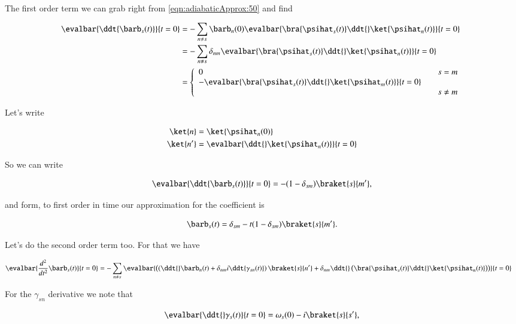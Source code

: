The first order term we can grab right from \ref{eqn:adiabaticApprox:50} and find

\begin{align*}
\evalbar{\ddt{\barb_s(t)}}{t=0} 
&= - \sum_{n \ne s} \barb_n(0) 
\evalbar{\bra{\psihat_s(t)} \ddt{} \ket{\psihat_n(t)}}{t=0} \\
&= 
- \sum_{n \ne s} \delta_{nm}
\evalbar{\bra{\psihat_s(t)} \ddt{} \ket{\psihat_n(t)}}{t=0} \\
&=
\left\{
\begin{array}{l l}
0 & \quad \mbox{$s = m$} \\
- 
\evalbar{\bra{\psihat_s(t)} \ddt{} \ket{\psihat_m(t)}}{t=0} \\
 & \quad \mbox{$s \ne m$} \\
\end{array}
\right.
\end{align*}

Let's write

\begin{align}\label{eqn:adiabaticApprox:250}
\ket{n} &= \ket{\psihat_n(0)} \\
\ket{n'} &= \evalbar{ \ddt{}\ket{\psihat_n(t)} }{t=0}
\end{align}

So we can write

\begin{equation}\label{eqn:adiabaticApprox:270}
\evalbar{\ddt{\barb_s(t)}}{t=0} 
=
- 
(1 - \delta_{sm}) \braket{s}{m'},
\end{equation}

and form, to first order in time our approximation for the coefficient is

\begin{equation}\label{eqn:adiabaticApprox:290}
\barb_s(t) 
=
\delta_{sm} - t (1 - \delta_{sm}) \braket{s}{m'}.
\end{equation}

Let's do the second order term too.  For that we have

\begin{align*}
\evalbar{\frac{d^2}{dt^2} \barb_s(t)}{t=0} 
&= - \sum_{n \ne s} 
\evalbar{
\left(
\left(
\ddt{} \barb_n(t) 
+
\delta_{nm} i 
\ddt{\gamma_{sn}(t)}
\right)
\braket{s}{n'}
+\delta_{nm} 
\ddt{} \left( \bra{\psihat_s(t)} \ddt{} \ket{\psihat_n(t)} \right) 
\right)
}{t=0}
\end{align*}

For the $\gamma_{sn}$ derivative we note that

\begin{equation}\label{eqn:adiabaticApprox:310}
\evalbar{\ddt{} \gamma_s(t)}{t=0} 
= 
\omega_s(0) - i\braket{s}{s'},
\end{equation}

